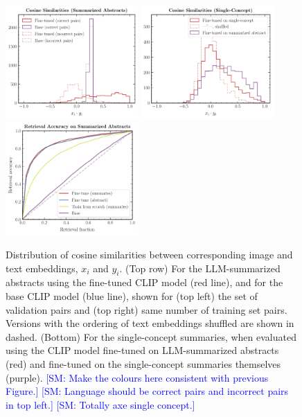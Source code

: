 \documentclass[10pt]{article} %
\newcommand{\SM}[1]{\textcolor{blue}{[SM: #1]}}
\begin{document}
\begin{figure}[!h]
\includegraphics[width=0.45\textwidth]{plots/sim_val.pdf}
\includegraphics[width=0.45\textwidth]{plots/sim_summ1.pdf}
\centering\includegraphics[width=0.45\textwidth]{plots/retrieval.pdf}
\caption{Distribution of cosine similarities between corresponding image and text embeddings, $x_i$ and $y_i$. (Top row) For the LLM-summarized abstracts using the fine-tuned CLIP model (red line), and for the base CLIP model (blue line), shown for (top left) the set of validation pairs and (top right) same number of training set pairs. Versions with the ordering of text embeddings shuffled are shown in dashed. (Bottom) For the single-concept summaries, when evaluated using the CLIP model fine-tuned on LLM-summarized abstracts (red) and fine-tuned on the single-concept summaries themselves (purple). \SM{Make the colours here consistent with previous Figure.} \SM{Language should be correct pairs and incorrect pairs in top left.} \SM{Totally axe single concept.}}
\label{fig:sim_valtrain}
\end{figure}
\end{document}

